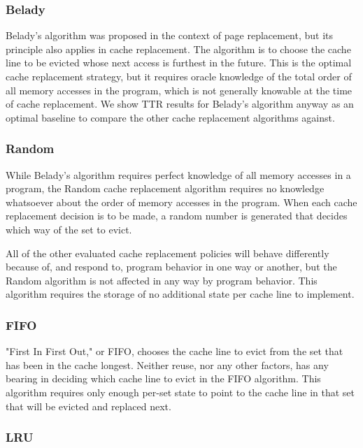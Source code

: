 \subsubsection{Belady}

Belady's algorithm was proposed in the context of page replacement, but its principle also applies in cache replacement.  The algorithm is to choose the cache line to be evicted whose next access is furthest in the future.  This is the optimal cache replacement strategy, but it requires oracle knowledge of the total order of all memory accesses in the program, which is not generally knowable at the time of cache replacement.  We show TTR results for Belady's algorithm anyway as an optimal baseline to compare the other cache replacement algorithms against.

\subsubsection{Random}

While Belady's algorithm requires perfect knowledge of all memory accesses in a program, the Random cache replacement algorithm requires no knowledge whatsoever about the order of memory accesses in the program.  When each cache replacement decision is to be made, a random number is generated that decides which way of the set to evict.

All of the other evaluated cache replacement policies will behave differently because of, and respond to, program behavior in one way or another, but the Random algorithm is not affected in any way by program behavior.  This algorithm requires the storage of no additional state per cache line to implement.

\subsubsection{FIFO}

"First In First Out," or FIFO, chooses the cache line to evict from the set that has been in the cache longest.  Neither reuse, nor any other factors, has any bearing in deciding which cache line to evict in the FIFO algorithm.  This algorithm requires only enough per-set state to point to the cache line in that set that will be evicted and replaced next.

\subsubsection{LRU}

